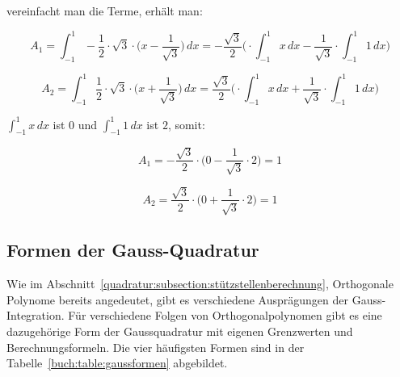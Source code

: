\noindent
vereinfacht man die Terme, erhält man:

\begin{equation*}
    A_{1} 
    =
    \int_{-1}^{1} -\frac{1}{2} 
    \cdot \sqrt{3} 
    \cdot \bigg(x - \frac{1}{\sqrt{3}}\bigg)
    \, dx
    =
    -\frac{\sqrt{3}}{2} 
    \bigg(
    \cdot \int_{-1}^{1}x\,dx
    -
    \frac{1}{\sqrt{3}} 
    \cdot \int_{-1}^{1}1\,dx
    \bigg)
\end{equation*}

\begin{equation}
    A_{2} 
    =
    \int_{-1}^{1} \frac{1}{2} 
    \cdot \sqrt{3}  
    \cdot \bigg(x + \frac{1}{\sqrt{3}}\bigg)
    \, dx
    =
    \frac{\sqrt{3}}{2} 
    \bigg(
    \cdot \int_{-1}^{1}x\,dx
    +
    \frac{1}{\sqrt{3}} 
    \cdot \int_{-1}^{1}1\,dx
    \bigg)
\end{equation}

\noindent
$\int_{-1}^{1}x\,dx$ ist $0$ und $\int_{-1}^{1}1\,dx$ ist $2$, somit:

\begin{equation*}
    A_{1} 
    =
    -\frac{\sqrt{3}}{2} 
    \cdot 
    \bigg( 0
    -
    \frac{1}{\sqrt{3}} 
    \cdot 2
    \bigg)
    =
    1
\end{equation*}

\begin{equation}
    A_{2} 
    =
    \frac{\sqrt{3}}{2} 
    \cdot
    \bigg( 0
    +
    \frac{1}{\sqrt{3}} 
    \cdot 2
    \bigg)
    = 
    1
\end{equation}

\newpage


\subsection{Formen der Gauss-Quadratur
\label{quadratur:subsection:gaussformen}}
Wie im Abschnitt~\ref{quadratur:subsection:stützstellenberechnung}, 
Orthogonale Polynome bereits angedeutet, 
gibt es verschiedene Ausprägungen der Gauss-Integration.
Für verschiedene Folgen von Orthogonalpolynomen gibt es eine dazugehörige
Form der Gaussquadratur mit eigenen Grenzwerten und Berechnungsformeln.
Die vier häufigsten Formen sind in der Tabelle~\ref{buch:table:gaussformen} abgebildet.

